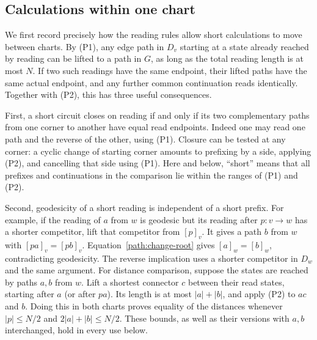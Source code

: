 \subsection{Calculations within one chart}

We first record precisely how the reading rules allow short calculations
to move between charts.  By (P1), any edge path in $D_v$ starting at a
state already reached by reading can be lifted to a path in $G$, as long
as the total reading length is at most $N$.  If two such readings have the
same endpoint, their lifted paths have the same actual endpoint, and any
further common continuation reads identically.  Together with (P2), this
has three useful consequences.

First, a short circuit closes on reading if and only if its two
complementary paths from one corner to another have equal read endpoints.
Indeed one may read one path and the reverse of the other, using (P1).
Closure can be tested at any corner: a cyclic change of starting corner
amounts to prefixing by a side, applying (P2), and cancelling that side
using (P1).  Here and below, ``short'' means that all prefixes and
continuations in the comparison lie within the ranges of (P1) and (P2).

Second, geodesicity of a short reading is independent of a short prefix.
For example, if the reading of $a$ from $w$ is geodesic but its reading
after $p:v\to w$ has a shorter competitor, lift that competitor from
$[p]_v$.  It gives a path $b$ from $w$ with
$[pa]_v=[pb]_v$.  Equation~\eqref{path:change-root} gives
$[a]_w=[b]_w$, contradicting geodesicity.  The reverse implication uses a
shorter competitor in $D_w$ and the same argument.  For distance
comparison, suppose the states are reached by paths $a,b$ from $w$.
Lift a shortest connector $c$ between their read states, starting after
$a$ (or after $pa$).  Its length is at most $|a|+|b|$, and apply (P2)
to $ac$ and $b$.  Doing this in both charts proves equality of the
distances whenever $|p|\le N/2$ and $2|a|+|b|\le N/2$.
These bounds, as well as their versions with $a,b$ interchanged, hold
in every use below.

